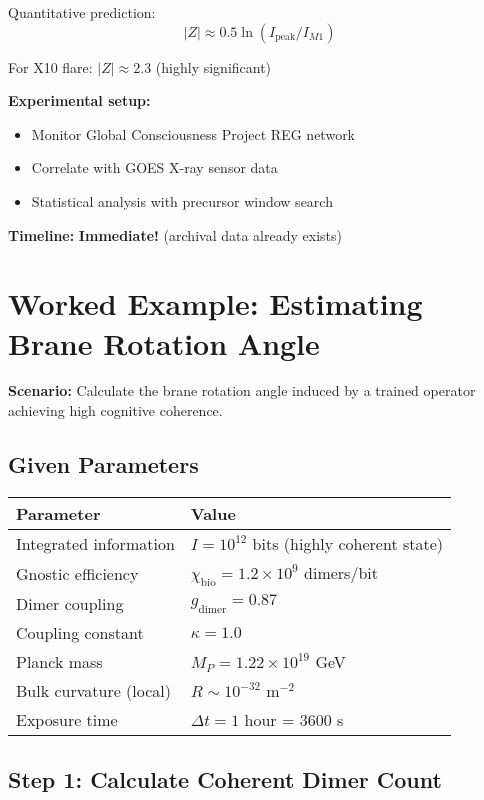 Quantitative prediction:
\begin{equation}
\label{eq:reg-z-score}
|Z| \approx 0.5 \ln(I_{\text{peak}}/I_{M1})
\end{equation}

For X10 flare: $|Z| \approx 2.3$ (highly significant)

\textbf{Experimental setup:}
\begin{itemize}
\item Monitor Global Consciousness Project REG network
\item Correlate with GOES X-ray sensor data
\item Statistical analysis with precursor window search
\end{itemize}

\textbf{Timeline:} \textbf{Immediate!} (archival data already exists)

\section{Worked Example: Estimating Brane Rotation Angle}
\label{sec:worked-example}

\textbf{Scenario:} Calculate the brane rotation angle induced by a trained operator achieving high cognitive coherence.

\subsection*{Given Parameters}

\begin{tabular}{@{}ll@{}}
\toprule
\textbf{Parameter} & \textbf{Value} \\
\midrule
Integrated information & $I = 10^{12}$ bits (highly coherent state) \\
Gnostic efficiency & $\chi_{\text{bio}} = 1.2 \times 10^9$ dimers/bit \\
Dimer coupling & $g_{\text{dimer}} = 0.87$ \\
Coupling constant & $\kappa = 1.0$ \\
Planck mass & $M_P = 1.22 \times 10^{19}$ GeV \\
Bulk curvature (local) & $R \sim 10^{-32}$ m$^{-2}$ \\
Exposure time & $\Delta t = 1$ hour = 3600 s \\
\bottomrule
\end{tabular}

\subsection*{Step 1: Calculate Coherent Dimer Count}

